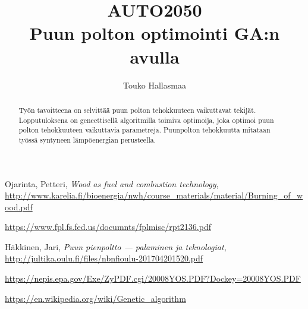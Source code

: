 \documentclass[12pt]{article}
\title{\normalsize\uppercase{auto2050}\\\Huge Puun polton optimointi GA:n avulla}
\author{Touko Hallasmaa}
\date{}
\begin{document}
\maketitle
\tableofcontents

\begin{abstract}
Työn tavoitteena on selvittää puun polton tehokkuuteen vaikuttavat tekijät.
Lopputuloksena on geneettisellä algoritmilla toimiva optimoija, joka optimoi
puun polton tehokkuuteen vaikuttavia parametreja. Puunpolton tehokkuutta
mitataan työssä syntyneen lämpöenergian perusteella.
\end{abstract}






\begin{thebibliography}{9}
	Ojarinta, Petteri,
	\textit{Wood as fuel and combustion technology},
	\url{http://www.karelia.fi/bioenergia/nwh/course_materials/material/Burning_of_wood.pdf}

	\url{https://www.fpl.fs.fed.us/documnts/fplmisc/rpt2136.pdf}

	Häkkinen, Jari,
	\textit{Puun pienpoltto --- palaminen ja teknologiat},
	\url{http://jultika.oulu.fi/files/nbnfioulu-201704201520.pdf}

	\url{https://nepis.epa.gov/Exe/ZyPDF.cgi/20008YOS.PDF?Dockey=20008YOS.PDF}

	\url{https://en.wikipedia.org/wiki/Genetic_algorithm}

\end{thebibliography}
\end{document}
